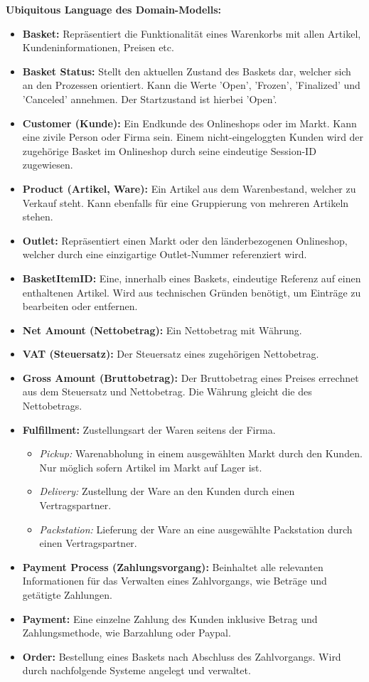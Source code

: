 {\large \textbf{Ubiquitous Language des Domain-Modells:}}
\begin{itemize}[topsep=-3px]
	\item \textbf{Basket: } {Repräsentiert die Funktionalität eines Warenkorbs mit allen Artikel, Kundeninformationen, Preisen etc.}
	\item \textbf{Basket Status: } {Stellt den aktuellen Zustand des Baskets dar, welcher sich an den Prozessen orientiert. Kann die Werte 'Open', 'Frozen', 'Finalized' und 'Canceled' annehmen. Der Startzustand ist hierbei 'Open'.}
	\item \textbf{Customer (Kunde): } {Ein Endkunde des Onlineshops oder im Markt. Kann eine zivile Person oder Firma sein. Einem nicht-eingeloggten Kunden wird der zugehörige Basket im Onlineshop durch seine eindeutige Session-ID zugewiesen.} 
	\item \textbf{Product (Artikel, Ware): } {Ein Artikel aus dem Warenbestand, welcher zu Verkauf steht. Kann ebenfalls für eine Gruppierung von mehreren Artikeln stehen.}
	\item \textbf{Outlet: } {Repräsentiert einen Markt oder den länderbezogenen Onlineshop, welcher durch eine einzigartige Outlet-Nummer referenziert wird.}
	\item \textbf{BasketItemID: } {Eine, innerhalb eines Baskets, eindeutige Referenz auf einen enthaltenen Artikel. Wird aus technischen Gründen benötigt, um Einträge zu bearbeiten oder entfernen.}
	\item \textbf{Net Amount (Nettobetrag): } {Ein Nettobetrag mit Währung.}
	\item \textbf{VAT (Steuersatz): } {Der Steuersatz eines zugehörigen Nettobetrag.}
	\item \textbf{Gross Amount (Bruttobetrag): } {Der Bruttobetrag eines Preises errechnet aus dem Steuersatz und Nettobetrag. Die Währung gleicht die des Nettobetrags.}
	\item \textbf{Fulfillment: } {Zustellungsart der Waren seitens der Firma.}
	\begin{itemize}[noitemsep,nolistsep, topsep=-5px]
		\item \textit{Pickup: } {Warenabholung in einem ausgewählten Markt durch den Kunden. Nur möglich sofern Artikel im Markt auf Lager ist.}
		\item \textit{Delivery: } {Zustellung der Ware an den Kunden durch einen Vertragspartner.}
		\item \textit{Packstation: } {Lieferung der Ware an eine ausgewählte Packstation durch einen Vertragspartner.}
	\end{itemize}
	\item \textbf{Payment Process (Zahlungsvorgang): } {Beinhaltet alle relevanten Informationen für das Verwalten eines Zahlvorgangs, wie Beträge und getätigte Zahlungen.}
	\item \textbf{Payment: } {Eine einzelne Zahlung des Kunden inklusive Betrag und Zahlungsmethode, wie Barzahlung oder Paypal.}
	\item \textbf{Order: } {Bestellung eines Baskets nach Abschluss des Zahlvorgangs. Wird durch nachfolgende Systeme angelegt und verwaltet.}
\end{itemize}

